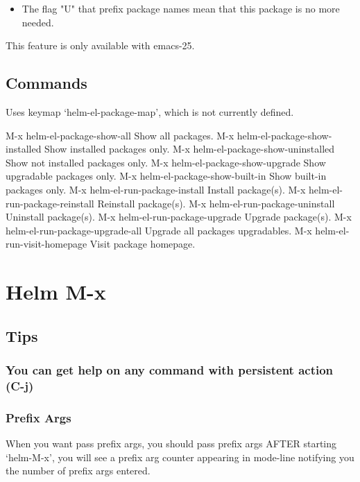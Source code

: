 \documentclass[11pt]{article}
\begin{document}
\begin{itemize}
\item The flag "U" that prefix package names mean that this package is no more needed.
\end{itemize}
This feature is only available with emacs-25.

\subsection{Commands}
\label{sec:orgd45d18d}

Uses keymap ‘helm-el-package-map’, which is not currently defined.

M-x helm-el-package-show-all		Show all packages.
M-x helm-el-package-show-installed		Show installed packages only.
M-x helm-el-package-show-uninstalled		Show not installed packages only.
M-x helm-el-package-show-upgrade		Show upgradable packages only.
M-x helm-el-package-show-built-in		Show built-in packages only.
M-x helm-el-run-package-install		Install package(s).
M-x helm-el-run-package-reinstall		Reinstall package(s).
M-x helm-el-run-package-uninstall		Uninstall package(s).
M-x helm-el-run-package-upgrade		Upgrade package(s).
M-x helm-el-run-package-upgrade-all		Upgrade all packages upgradables.
M-x helm-el-run-visit-homepage		Visit package homepage.

\section{Helm M-x}
\label{sec:org56390eb}

\subsection{Tips}
\label{sec:org664c479}

\subsubsection{You can get help on any command with persistent action (C-j)}
\label{sec:orga06743f}

\subsubsection{Prefix Args}
\label{sec:org34e51cd}

When you want pass prefix args, you should pass prefix args AFTER starting ‘helm-M-x’,
you will see a prefix arg counter appearing in mode-line notifying you
the number of prefix args entered.
\end{document}
